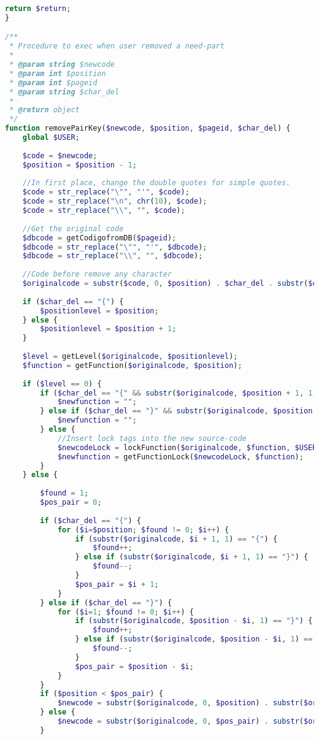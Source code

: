 \begin{lstlisting}[language=PHP]
	return $return;
}

/**
 * Procedure to exec when user removed a need-part
 * 
 * @param string $newcode
 * @param int $position
 * @param int $pageid
 * @param string $char_del
 * 
 * @return object
 */
function removePairKey($newcode, $position, $pageid, $char_del) {
	global $USER;
	
	$code = $newcode;
	$position = $position - 1;
	
	//In first place, change the double quotes for simple quotes.
	$code = str_replace("\"", "'", $code);
	$code = str_replace("\n", chr(10), $code);
    $code = str_replace("\\", "", $code);
	
	//Get the original code
	$dbcode = getCodigofromDB($pageid);
	$dbcode = str_replace("\"", "'", $dbcode);
    $dbcode = str_replace("\\", "", $dbcode);
	
	//Code before remove any character
	$originalcode = substr($code, 0, $position) . $char_del . substr($code, $position);
	
	if ($char_del == "{") {
		$positionlevel = $position;
	} else {
		$positionlevel = $position + 1;
	}
	
	$level = getLevel($originalcode, $positionlevel);
	$function = getFunction($originalcode, $position);
	
	if ($level == 0) {
		if ($char_del == "{" && substr($originalcode, $position + 1, 1) == "}") {
			$newfunction = "";
		} else if ($char_del == "}" && substr($originalcode, $position -1, 1) == "{") {
			$newfunction = "";
		} else {
			//Insert lock tags into the new source-code
			$newcodeLock = lockFunction($originalcode, $function, $USER->username);
			$newfunction = getFunctionLock($newcodeLock, $function);
		}
	} else {
			
		$found = 1;
		$pos_pair = 0;
		
		if ($char_del == "{") {
			for ($i=$position; $found != 0; $i++) {
				if (substr($originalcode, $i + 1, 1) == "{") {
					$found++;
				} else if (substr($originalcode, $i + 1, 1) == "}") {
					$found--;
				}
				$pos_pair = $i + 1;
			}	
		} else if ($char_del == "}") {
			for ($i=1; $found != 0; $i++) {
				if (substr($originalcode, $position - $i, 1) == "}") {
					$found++;
				} else if (substr($originalcode, $position - $i, 1) == "{") {
					$found--;
				}
				$pos_pair = $position - $i;
			} 
		}
		if ($position < $pos_pair) {
			$newcode = substr($originalcode, 0, $position) . substr($originalcode, $position + 1, $pos_pair - $position - 1) . substr($originalcode, $pos_pair + 1);
		} else {
			$newcode = substr($originalcode, 0, $pos_pair) . substr($originalcode, $pos_pair + 1, $position - $pos_pair - 1) . substr($originalcode, $position + 1);
		}
		

\end{lstlisting}
